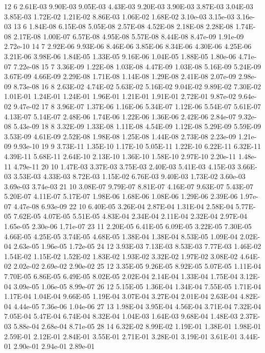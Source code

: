 12 6  	2.61E-03	9.90E-03	9.05E-03	4.43E-03	9.20E-03	3.90E-03	3.87E-03	3.04E-03	3.85E-03	1.72E-02	1.21E-02	8.86E-03	1.06E-02	1.68E-02	3.10e-03	3.15e-03	3.16e-03
13 6  	1.84E-08	6.15E-08	5.05E-08	2.57E-08	4.52E-08	2.18E-08	2.28E-08	1.74E-08	2.17E-08	1.00E-07	6.57E-08	4.95E-08	5.57E-08	8.44E-08	8.47e-09	1.91e-09	2.72e-10
14 7  	2.92E-06	9.93E-06	8.46E-06	3.85E-06	8.34E-06	4.30E-06	4.25E-06	3.21E-06	3.98E-06	1.84E-05	1.33E-05	9.16E-06	1.04E-05	1.88E-05	1.80e-06	4.71e-07	7.22e-08
15 7  	3.36E-09	1.22E-08	1.03E-08	4.47E-09	1.03E-08	5.16E-09	5.24E-09	3.67E-09	4.66E-09	2.29E-08	1.71E-08	1.14E-08	1.29E-08	2.41E-08	2.07e-09	2.98e-09	8.73e-08
16 8  	2.63E-02	4.74E-02	5.63E-02	5.16E-02	9.04E-02	9.89E-02	7.30E-02	1.01E-01	1.24E-01	1.24E-01	1.96E-01	1.21E-01	1.91E-01	2.72E-01	9.87e-02	9.64e-02	9.47e-02
17 8  	3.96E-07	1.37E-06	1.16E-06	5.34E-07	1.12E-06	5.54E-07	5.61E-07	4.13E-07	5.14E-07	2.48E-06	1.74E-06	1.22E-06	1.36E-06	2.42E-06	2.84e-07	9.32e-08	5.43e-09
18 8  	3.32E-09	1.33E-08	1.11E-08	4.54E-09	1.12E-08	5.29E-09	5.59E-09	3.53E-09	4.61E-09	2.52E-08	1.98E-08	1.25E-08	1.44E-08	2.73E-08	2.23e-09	1.21e-09	9.93e-10
19 9  	3.73E-11	1.35E-10	1.17E-10	5.05E-11	1.22E-10	6.22E-11	6.32E-11	4.39E-11	5.68E-11	2.64E-10	2.13E-10	1.36E-10	1.58E-10	2.97E-10	2.20e-11	1.48e-11	4.79e-11
20 10 	1.47E-03	3.37E-03	3.75E-03	2.40E-03	5.41E-03	4.15E-03	3.66E-03	3.53E-03	4.33E-03	8.72E-03	1.15E-02	6.76E-03	9.40E-03	1.73E-02	3.60e-03	3.69e-03	3.74e-03
21 10 	3.08E-07	9.79E-07	8.81E-07	4.16E-07	9.63E-07	5.43E-07	5.20E-07	4.11E-07	5.17E-07	1.98E-06	1.68E-06	1.08E-06	1.29E-06	2.39E-06	1.97e-07	4.47e-08	6.93e-09
22 10 	6.40E-05	3.26E-04	2.87E-04	1.31E-04	2.58E-04	5.77E-05	7.62E-05	4.07E-05	5.51E-05	4.83E-04	2.34E-04	2.11E-04	2.32E-04	2.97E-04	1.65e-05	2.30e-06	1.71e-07
23 11 	2.20E-05	6.41E-05	6.09E-05	3.22E-05	7.30E-05	4.66E-05	4.25E-05	3.74E-05	4.68E-05	1.38E-04	1.38E-04	8.53E-05	1.09E-04	2.02E-04	2.63e-05	1.96e-05	1.72e-05
24 12 	3.93E-03	7.13E-03	8.53E-03	7.77E-03	1.46E-02	1.54E-02	1.15E-02	1.52E-02	1.83E-02	1.93E-02	3.32E-02	1.97E-02	3.08E-02	4.64E-02	2.02e-02	2.69e-02	2.90e-02
25 12 	3.35E-05	9.26E-05	8.92E-05	5.07E-05	1.11E-04	7.70E-05	6.86E-05	6.49E-05	8.02E-05	2.02E-04	2.14E-04	1.33E-04	1.75E-04	3.12E-04	3.09e-05	1.06e-05	8.99e-07
26 12 	5.15E-05	1.36E-04	1.34E-04	7.55E-05	1.71E-04	1.17E-04	1.04E-04	9.66E-05	1.19E-04	3.07E-04	3.27E-04	2.01E-04	2.63E-04	4.82E-04	4.44e-05	7.36e-06	1.04e-06
27 13 	1.98E-04	3.95E-04	4.56E-04	3.71E-04	7.32E-04	7.05E-04	5.47E-04	6.74E-04	8.32E-04	1.04E-03	1.64E-03	9.68E-04	1.48E-03	2.37E-03	5.88e-04	2.68e-04	8.71e-05
28 14 	6.32E-02	8.99E-02	1.19E-01	1.38E-01	1.98E-01	2.59E-01	2.12E-01	2.84E-01	3.55E-01	2.71E-01	3.28E-01	3.19E-01	3.61E-01	3.44E-01	2.90e-01	2.94e-01	2.89e-01
